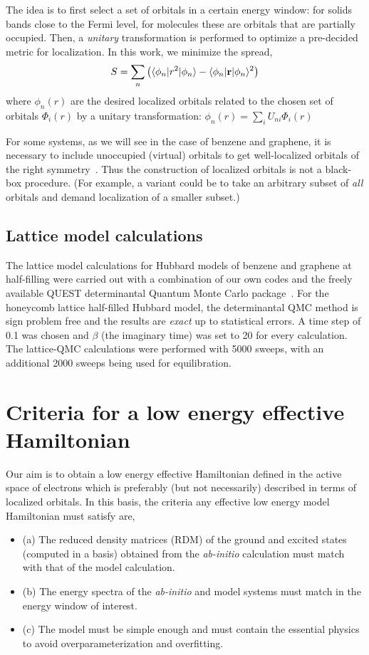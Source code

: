 \documentclass[aip,jcp,twocolumn,10pt]{revtex4-1}
\begin{document}
The idea is to first select a set of orbitals 
in a certain energy window: for solids bands close to the Fermi level, for 
molecules these are orbitals that are partially occupied. 
Then, a \emph{unitary} transformation is performed to optimize a 
pre-decided metric for localization.
In this work, we minimize the 
spread,
\begin{equation}
S = \sum_{n} \left( \langle \phi_n | r^2 | \phi_n \rangle - \langle \phi_n | {\bf{r}} | \phi_n \rangle^{2} \right)
\end{equation} 
where $\phi_n(r)$ are the desired localized orbitals related to the chosen set of 
orbitals $\Phi_i(r)$ by a unitary transformation: 
$\phi_n (r) = \sum_{i} U_{ni} \Phi_i(r)$  

For some systems, as we will see in the case of benzene and graphene, 
it is necessary to include unoccupied 
(virtual) orbitals to get well-localized orbitals of the right symmetry~\cite{Hansen}.
Thus the construction of localized orbitals is not a black-box procedure.
(For example, a variant could be to take an arbitrary subset of \emph{all} 
orbitals and demand localization of a smaller subset.)

\subsection{Lattice model calculations}
The lattice model calculations for Hubbard models of 
benzene and graphene at half-filling were carried out with a combination of our own codes 
and the freely available QUEST determinantal Quantum Monte Carlo package~\cite{QUEST}. 
For the honeycomb lattice half-filled Hubbard model, the determinantal QMC 
method is sign problem free and the results are \emph{exact} up to statistical errors.
A time step of 0.1 was chosen and $\beta$ (the imaginary time) was set to 20 for every calculation. 
The lattice-QMC calculations were performed with 5000 sweeps, with an additional 
2000 sweeps being used for equilibration.

\section{Criteria for a low energy effective Hamiltonian}
\label{sec:demands}
Our aim is to obtain a low energy effective Hamiltonian defined in 
the active space of electrons which is preferably (but not necessarily) 
described in terms of localized orbitals. In this basis, the criteria any 
effective low energy model Hamiltonian must satisfy are,
\begin{itemize}
\item (a) The reduced density matrices (RDM) of the ground and excited states (computed in a basis) 
          obtained from the \emph{ab-initio} calculation must match with that of the model calculation. 

\item (b) The energy spectra of the \emph{ab-initio} and model systems must match in the energy window of interest. 

\item(c) The model must be simple enough and must contain the essential physics to avoid overparameterization and overfitting. 
\end{itemize}
\end{document}

